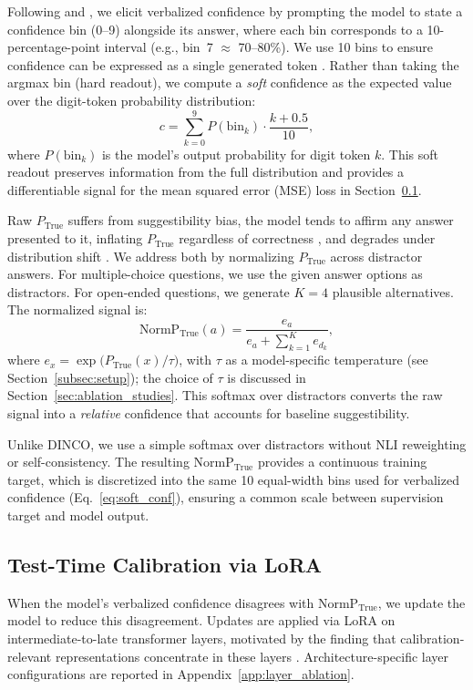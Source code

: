 \documentclass[11pt]{article}
\begin{document}
Following \citet{lin_teaching_2022} and \citet{tian_just_2023}, we elicit verbalized confidence by prompting the model to state a confidence bin (0--9) alongside its answer, where each bin corresponds to a 10-percentage-point interval (e.g., bin~7 $\approx$ 70--80\%). We use 10 bins to ensure confidence can be expressed as a single generated token \cite{naeini_obtaining_2015, guo_calibration_2017}. Rather than taking the argmax bin (hard readout), we compute a \emph{soft} confidence as the expected value over the digit-token probability distribution:
%
\begin{equation} \label{eq:soft_conf}
    c = \sum_{k=0}^{9} P(\text{bin}_k) \cdot 
    \frac{k + 0.5}{10},
\end{equation}
%
where $P(\text{bin}_k)$ is the model's output probability for digit token $k$. This soft readout preserves information from the full distribution and provides a differentiable signal for the mean squared error (MSE) loss in Section~\ref{subsec:ttc}.

Raw $P_{\text{True}}$ suffers from suggestibility bias, the model tends to affirm any answer presented to it, inflating $P_{\text{True}}$ regardless of correctness \cite{wang_calibrating_2025}, and degrades under distribution shift \cite{haller_llm_2025}. We address both by normalizing $P_{\text{True}}$ across distractor answers. For multiple-choice questions, we use the given answer options as distractors. For open-ended questions, we generate $K{=}4$ plausible alternatives. The normalized signal is:
%
\begin{equation} \label{eq:normp}
    \text{NormP}_{\text{True}}(a) = \frac{e_a}{e_a + \sum_{k=1}^{K} e_{d_k}},
\end{equation}
%
where $e_x = \exp\!\big(P_{\text{True}}(x) / \tau\big)$, with $\tau$ as a model-specific temperature (see Section~\ref{subsec:setup}); the choice of $\tau$ is discussed in Section~\ref{sec:ablation_studies}.
This softmax over distractors converts the raw signal into a \emph{relative} confidence that accounts for baseline suggestibility.

Unlike DINCO, we use a simple softmax over distractors without NLI reweighting or self-consistency. The resulting $\text{NormP}_{\text{True}}$ provides a continuous training target, which is discretized into the same 10 equal-width bins used for verbalized confidence (Eq.~\ref{eq:soft_conf}), ensuring a common scale between supervision target and model output.

\subsection{Test-Time Calibration via LoRA} \label{subsec:ttc}
When the model's verbalized confidence disagrees with $\text{NormP}_{\text{True}}$, we update the model to reduce this disagreement. Updates are applied via LoRA \cite{hu_lora_2022} on intermediate-to-late transformer layers, motivated by the finding that calibration-relevant representations concentrate in these layers \cite{du_haloscope_2024}. Architecture-specific layer configurations are reported in Appendix~\ref{app:layer_ablation}.
\end{document}
